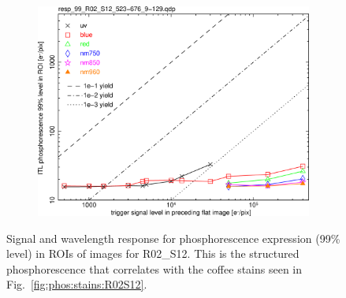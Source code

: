 \begin{figure}[!htbp]
\centering
\begin{subfigure}{0.45\textwidth}    
  \centering
  \includegraphics[width=\textwidth]{figures/phosphorescence-survey/phos_resp/resp_99_R02_S12_523-676_9-129.png}    
\end{subfigure}
\newline
\caption{Signal and wavelength response for phosphorescence expression (99\% level) in ROIs of images for R02\_S12. This is the structured phosphorescence that correlates with the coffee stains seen in Fig.~\ref{fig:phos:stains:R02S12}.}
\label{fig:phos:resp:R02S12}
\end{figure}

